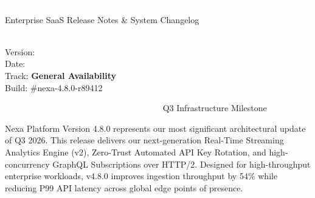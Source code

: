\documentclass[10pt,a4paper]{article}
\newcommand{\sectionTitle}[2]{%
  \vspace{7pt}
  \begin{tcolorbox}[
    enhanced,
    colback=brandPrimary,
    colframe=brandPrimary,
    arc=3pt,
    left=8pt, right=8pt, top=4pt, bottom=4pt,
    boxrule=0pt
  ]
    \textcolor{white}{\large\bfseries #1} \hfill \textcolor{brandAccentLight}{\small\sffamily #2}
  \end{tcolorbox}
  \vspace{1pt}
}
\begin{document}
\begin{tcolorbox}[
  enhanced,
  colback=brandDark,
  colframe=brandDark,
  arc=5pt,
  boxrule=0pt,
  left=14pt, right=14pt, top=10pt, bottom=10pt
]
  \begin{minipage}{0.65\textwidth}
    \hspace{8pt}
    \begin{minipage}[b]{0.75\textwidth}
      {\Huge\bfseries\textcolor{white}{NEXA PLATFORM}}\\[2pt]
      {\textcolor{brandAccentLight}{\small\sffamily Enterprise SaaS Release Notes \& System Changelog}}
    \end{minipage}
  \end{minipage}
  \hfill
  \begin{minipage}{0.30\textwidth}
    \begin{tcolorbox}[
      enhanced,
      colback=brandPrimary,
      colframe=neutralBorder!20,
      arc=3pt,
      boxrule=0.5pt,
      left=6pt, right=6pt, top=4pt, bottom=4pt
    ]
      \textcolor{white}{\small\bfseries Release Metadata}\\[2pt]
      \textcolor{neutralBorder}{\tiny Version:} \hfill \textcolor{white}{\small\bfseries v4.8.0}\\[1pt]
      \textcolor{neutralBorder}{\tiny Date:} \hfill \textcolor{white}{\small July 24, 2026}\\[1pt]
      \textcolor{neutralBorder}{\tiny Track:} \hfill \textcolor{badgeAddedBg}{\small\bfseries General Availability}\\[1pt]
      \textcolor{neutralBorder}{\tiny Build:} \hfill \textcolor{neutralBorder}{\ttfamily \#nexa-4.8.0-r89412}
    \end{tcolorbox}
  \end{minipage}
\end{tcolorbox}

\vspace{3pt}

\sectionTitle{1. Executive Summary \& Highlights}{Q3 Infrastructure Milestone}

Nexa Platform Version 4.8.0 represents our most significant architectural update of Q3 2026. This release delivers our next-generation Real-Time Streaming Analytics Engine (v2), Zero-Trust Automated API Key Rotation, and high-concurrency GraphQL Subscriptions over HTTP/2. Designed for high-throughput enterprise workloads, v4.8.0 improves ingestion throughput by 54\% while reducing P99 API latency across global edge points of presence.
\end{document}
